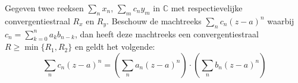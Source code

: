 \documentclass[main.tex]{subfiles}
\begin{document}
\begin{bpr}
  Gegeven twee reeksen $\sum_{n}x_{n}$, $\sum_{m}c_{n}y_{m}$ in $\mathbb{C}$ met respectievelijke convergentiestraal $R_{x}$ en $R_{y}$.
  Beschouw de machtreeks $\sum_{n}c_{n}(z-a)^{n}$ waarbij $c_{n} = \sum_{k=0}^{n}a_{k}b_{n-k}$, dan heeft deze machtreeks een convergentiestraal $R \ge \min\{R_{1},R_{2}\}$ en geldt het volgende:
  \[ \sum_{n}c_{n}(z-a)^{n} = \left( \sum_{n}a_{n}(z-a)^{n}\right)\cdot \left( \sum_{n}b_{n}(z-a)^{n}\right) \]
\end{bpr}
\end{document}
